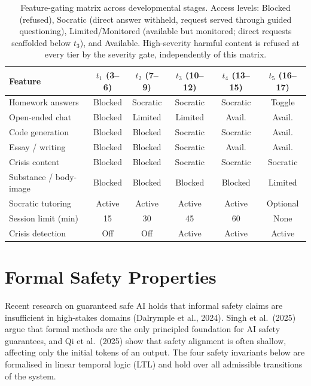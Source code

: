 \documentclass[fleqn,10pt]{wlscirep}
\begin{document}
\begin{table}[H]
\centering
\caption{Feature-gating matrix across developmental stages. Access levels: Blocked (refused), Socratic (direct answer withheld, request served through guided questioning), Limited/Monitored (available but monitored; direct requests scaffolded below $t_3$), and Available. High-severity harmful content is refused at every tier by the severity gate, independently of this matrix.}
\label{tab:gating}
\begin{tabular}{lccccc}
\hline
\textbf{Feature} & $t_1$ \textbf{(3--6)} & $t_2$ \textbf{(7--9)} & $t_3$ \textbf{(10--12)} & $t_4$ \textbf{(13--15)} & $t_5$ \textbf{(16--17)} \\
\hline
Homework answers & Blocked & Socratic & Socratic & Socratic & Toggle \\
Open-ended chat & Blocked & Limited & Limited & Avail. & Avail. \\
Code generation & Blocked & Blocked & Socratic & Socratic & Avail. \\
Essay / writing & Blocked & Blocked & Socratic & Avail. & Avail. \\
Crisis content & Blocked & Blocked & Socratic & Socratic & Socratic \\
Substance / body-image & Blocked & Blocked & Blocked & Blocked & Limited \\
Socratic tutoring & Active & Active & Active & Active & Optional \\
Session limit (min) & 15 & 30 & 45 & 60 & None \\
Crisis detection & Off & Off & Active & Active & Active \\
\hline
\end{tabular}
\end{table}

\section*{Formal Safety Properties}

Recent research on guaranteed safe AI holds that informal safety claims are insufficient in high-stakes domains (Dalrymple et al., 2024)\cite{Dalrymple2024}. Singh et al.\ (2025)\cite{Singh2025} argue that formal methods are the only principled foundation for AI safety guarantees, and Qi et al.\ (2025)\cite{Qi2025} show that safety alignment is often shallow, affecting only the initial tokens of an output. The four safety invariants below are formalised in linear temporal logic (LTL) and hold over all admissible transitions of the system.
\end{document}
